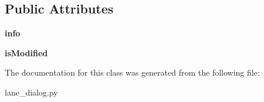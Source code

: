 \subsection*{Public Attributes}
\begin{DoxyCompactItemize}
\item 
\hypertarget{class_sim_g_d_c_1_1lane__dialog_1_1_lane_dialog_a64bc913ea31aa3c1525e71dccf3eeb29}{}{\bfseries info}\label{class_sim_g_d_c_1_1lane__dialog_1_1_lane_dialog_a64bc913ea31aa3c1525e71dccf3eeb29}

\item 
\hypertarget{class_sim_g_d_c_1_1lane__dialog_1_1_lane_dialog_a12aaa8f8669db94cc9dfca47f59fcc96}{}{\bfseries is\+Modified}\label{class_sim_g_d_c_1_1lane__dialog_1_1_lane_dialog_a12aaa8f8669db94cc9dfca47f59fcc96}

\end{DoxyCompactItemize}


The documentation for this class was generated from the following file\+:\begin{DoxyCompactItemize}
\item 
lane\+\_\+dialog.\+py\end{DoxyCompactItemize}
